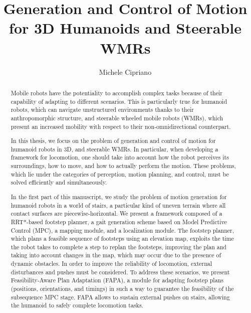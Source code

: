 \documentclass[oneside]{sapthesis}
\title{Generation and Control of Motion for 3D Humanoids and Steerable WMRs}
\author{Michele Cipriano}
\begin{document}
\frontmatter

\maketitle


\begin{abstract}
Mobile robots have the potentiality to accomplish complex tasks because of 
their capability of adapting to different scenarios. This is particularly 
true for humanoid robots, which can navigate unstructured environments thanks 
to their anthropomorphic structure, and steerable wheeled mobile robots (WMRs),
which present an increased mobility with respect to their non-omnidirectional 
counterpart.

In this thesis, we focus on the problem of generation and control of motion 
for humanoid robots in 3D, and steerable WMRs. In particular, when developing 
a framework for locomotion, one should take into account how the 
robot perceives its surroundings, how to move, and how to actually perform 
the motion. These problems, which lie under the categories of perception,
motion planning, and control, must be solved efficiently and simultaneously.

In the first part of this manuscript, we study the problem of motion generation 
for humanoid robots in a world of stairs, a particular kind of uneven terrain 
where all contact surfaces are piecewise-horizontal. We present a framework 
composed of a RRT*-based footstep planner, a gait generation scheme based 
on Model Predictive Control (MPC), a mapping module, and a localization module.
The footstep planner, which plans a feasible sequence of footsteps using an
elevation map, exploits the time the robot takes to complete a step to
replan the footsteps, improving the plan and taking 
into account changes in the map, which may occur due to the presence of 
dynamic obstacles. In order to improve the reliability of locomotion,
external disturbances and pushes must be considered. To address these scenarios,
we present 
Feasibility-Aware Plan Adaptation (FAPA), a module for adapting 
footstep plans (positions, orientations, and timings) in such a way 
to guarantee the feasibility of the subsequence MPC stage. FAPA allows to 
sustain external pushes on stairs, allowing the humanoid to safely complete 
locomotion tasks.


\end{abstract}
\end{document}

